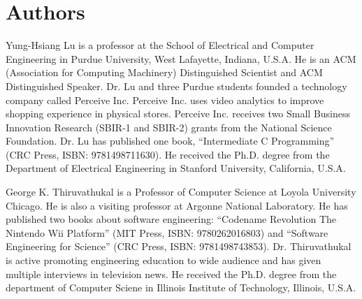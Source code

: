\chapter*{Authors}

 Yung-Hsiang Lu is a
professor at the School of Electrical and Computer Engineering in
Purdue University, West Lafayette, Indiana, U.S.A.  He is an ACM
(Association for Computing Machinery) Distinguished Scientist and ACM
Distinguished Speaker.  Dr. Lu and three Purdue students founded a
technology company called Perceive Inc. Perceive Inc. uses video
analytics to improve shopping experience in physical stores. Perceive
Inc.  receives two Small Business Innovation Research (SBIR-1 and
SBIR-2) grants from the National Science Foundation.  Dr. Lu has
published one book, ``Intermediate C Programming'' (CRC Press, ISBN:
9781498711630).  He received the Ph.D. degree from the Department of
Electrical Engineering in Stanford University, California, U.S.A.

George K. Thiruvathukal is a Professor of Computer Science at Loyola
University Chicago. He is also a visiting professor at Argonne
National Laboratory.  He has published two books about software
engineering: ``Codename Revolution The Nintendo Wii Platform'' (MIT
Press, ISBN: 9780262016803) and ``Software Engineering for Science''
(CRC Press, ISBN: 9781498743853). Dr. Thiruvathukal is active
promoting engineering education to wide audience and has given
multiple interviews in television news.  He received the Ph.D. degree
from the department of Computer Sciene in Illinois Institute of
Technology, Illinois, U.S.A.
